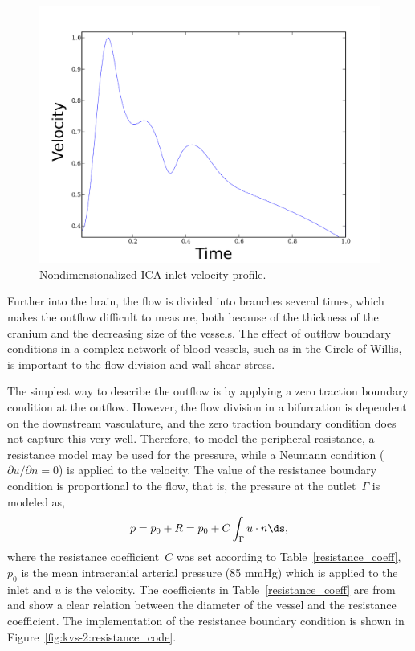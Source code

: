 \begin{figure}
  \center\includegraphics[width=\largefig]{chapters/kvs-2/pdf/systolic.pdf}
   \caption{Nondimensionalized ICA inlet velocity profile.}
\label{fig:kvs-2:ford}
\end{figure}

Further into the brain, the flow is divided into branches several
times, which makes the outflow difficult to measure, both because of
the thickness of the cranium and the decreasing size of the vessels.
The effect of outflow boundary conditions in a complex network of
blood vessels, such as in the Circle of Willis, is important to the
flow division and wall shear stress.

The simplest way to describe the outflow is by applying a zero
traction boundary condition at the outflow. However, the flow division
in a bifurcation is dependent on the downstream vasculature, and the
zero traction boundary condition does not capture this very
well. Therefore, to model the peripheral resistance, a resistance
model may be used for the pressure, while a Neumann condition
(${\partial u / \partial n} = 0 $) is applied to the velocity. The
value of the resistance boundary condition is proportional to the
flow, that is, the pressure at the outlet~$\Gamma$ is modeled as,
\begin{equation} \label{kvs-2:eq:resistancebc}
  p = p_0 + R = p_0 + C \int_\Gamma u \cdot n \ds,
\end{equation}
where the resistance coefficient~$C$ was set according to
Table~\ref{resistance_coeff}, $p_0$ is the mean intracranial arterial
pressure (85 mmHg) which is applied to the inlet and $u$ is the
velocity. The coefficients in Table~\ref{resistance_coeff} are
from \citet{AlastrueyParkerPeiroEtAl2007} and show a clear relation
between the diameter of the vessel and the resistance coefficient. The
implementation of the resistance boundary condition is shown in
Figure~\ref{fig:kvs-2:resistance_code}.

